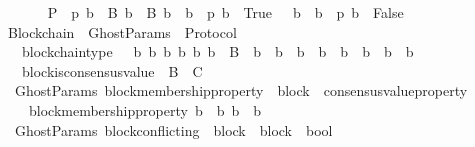 \begin{isabellebody}
\ \ \isanewline
\ \ \ \ {\isachardoublequoteopen}P\ {\isasymequiv}\ {\isacharbraceleft}p{\isachardot}\ {\isasymexists}{\isacharbang}b\ {\isasymin}\ B{\isachardot}\ {\isasymforall}b{\isacharprime}\ {\isasymin}\ B{\isachardot}\ {\isacharparenleft}b\ {\isasymdownharpoonright}\ b{\isacharprime}\ {\isasymlongrightarrow}\ p\ b{\isacharprime}\ {\isacharequal}\ True{\isacharparenright}\ {\isasymand}\ {\isasymnot}\ {\isacharparenleft}b\ {\isasymdownharpoonright}\ b{\isacharprime}\ {\isasymlongrightarrow}\ p\ b{\isacharprime}\ {\isacharequal}\ False{\isacharparenright}{\isacharbraceright}{\isachardoublequoteclose}\isanewline
\isanewline
\isanewline
{}\isamarkupfalse%
\ Blockchain\ {\isacharequal}\ GhostParams\ {\isacharplus}\ Protocol\ {\isacharplus}\isanewline
\ \ \ blockchain{\isacharunderscore}type\ {\isacharcolon}\ {\isachardoublequoteopen}{\isasymforall}\ b\ b{\isacharprime}\ b{\isacharprime}{\isacharprime}{\isachardot}\ {\isacharbraceleft}b{\isacharcomma}\ b{\isacharprime}{\isacharcomma}\ b{\isacharprime}{\isacharprime}{\isacharbraceright}\ {\isasymsubseteq}\ B\ {\isasymlongrightarrow}\ b{\isacharprime}\ {\isasymdownharpoonright}\ b\ {\isasymand}\ b{\isacharprime}{\isacharprime}\ {\isasymdownharpoonright}\ b\ {\isasymlongrightarrow}\ {\isacharparenleft}b{\isacharprime}\ {\isasymdownharpoonright}\ b{\isacharprime}{\isacharprime}\ {\isasymor}\ b{\isacharprime}{\isacharprime}\ {\isasymdownharpoonright}\ b{\isacharprime}{\isacharparenright}{\isachardoublequoteclose}\isanewline
\ \ \ block{\isacharunderscore}is{\isacharunderscore}consensus{\isacharunderscore}value\ {\isacharcolon}\ {\isachardoublequoteopen}B\ {\isacharequal}\ C{\isachardoublequoteclose}\isanewline
\isanewline
{}\isamarkupfalse%
\ {\isacharparenleft}\ GhostParams{\isacharparenright}\ block{\isacharunderscore}membership{\isacharunderscore}property\ {\isacharcolon}{\isacharcolon}\ {\isachardoublequoteopen}block\ {\isasymRightarrow}\ consensus{\isacharunderscore}value{\isacharunderscore}property{\isachardoublequoteclose}\isanewline
\ \ \isanewline
\ \ \ \ {\isachardoublequoteopen}block{\isacharunderscore}membership{\isacharunderscore}property\ b\ {\isacharequal}\ {\isacharparenleft}{\isasymlambda}b{\isacharprime}{\isachardot}\ b\ {\isasymdownharpoonright}\ b{\isacharprime}{\isacharparenright}{\isachardoublequoteclose}\isanewline
\isanewline
{}\isamarkupfalse%
\ {\isacharparenleft}\ GhostParams{\isacharparenright}\ block{\isacharunderscore}conflicting\ {\isacharcolon}{\isacharcolon}\ {\isachardoublequoteopen}{\isacharparenleft}block\ {\isacharasterisk}\ block{\isacharparenright}\ {\isasymRightarrow}\ bool{\isachardoublequoteclose}\isanewline

\end{isabellebody}

